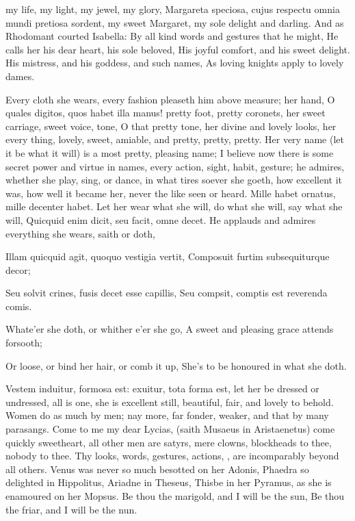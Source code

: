 {my life, my light, my jewel, my glory, Margareta speciosa, cujus
respectu omnia mundi pretiosa sordent, my sweet Margaret, my sole
delight and darling. And as Rhodomant courted Isabella:
By all kind words and gestures that he might,
He calls her his dear heart, his sole beloved,
His joyful comfort, and his sweet delight.
His mistress, and his goddess, and such names,
As loving knights apply to lovely dames.

Every cloth she wears, every fashion pleaseth him above measure; her
hand, O quales digitos, quos habet illa manus! pretty foot, pretty
coronets, her sweet carriage, sweet voice, tone, O that pretty tone,
her divine and lovely looks, her every thing, lovely, sweet, amiable,
and pretty, pretty, pretty. Her very name (let it be what it will) is a
most pretty, pleasing name; I believe now there is some secret power
and virtue in names, every action, sight, habit, gesture; he admires,
whether she play, sing, or dance, in what tires soever she goeth, how
excellent it was, how well it became her, never the like seen or heard.
Mille habet ornatus, mille decenter habet. Let her wear what she
will, do what she will, say what she will, Quicquid enim dicit,
seu facit, omne decet. He applauds and admires everything she wears,
saith or doth,

Illam quicquid agit, quoquo vestigia vertit,
Composuit furtim subsequiturque decor;

Seu solvit crines, fusis decet esse capillis,
Seu compsit, comptis est reverenda comis.


Whate'er she doth, or whither e'er she go,
A sweet and pleasing grace attends forsooth;

Or loose, or bind her hair, or comb it up,
She's to be honoured in what she doth.

Vestem induitur, formosa est: exuitur, tota forma est, let her be
dressed or undressed, all is one, she is excellent still, beautiful,
fair, and lovely to behold. Women do as much by men; nay more, far
fonder, weaker, and that by many parasangs. Come to me my dear Lycias,
(saith Musaeus in Aristaenetus) come quickly sweetheart, all
other men are satyrs, mere clowns, blockheads to thee, nobody to thee.
Thy looks, words, gestures, actions, \etc{}, are incomparably beyond all
others. Venus was never so much besotted on her Adonis, Phaedra so
delighted in Hippolitus, Ariadne in Theseus, Thisbe in her Pyramus, as
she is enamoured on her Mopsus.
Be thou the marigold, and I will be the sun,
Be thou the friar, and I will be the nun.

}
